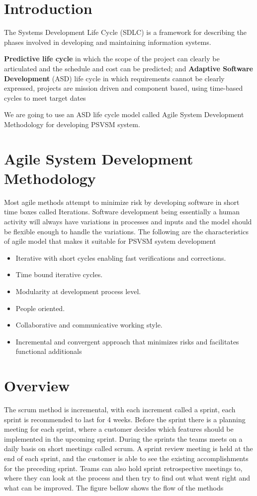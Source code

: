 \documentclass[a4paper, 12pt]{report}
\begin{document}
\section{Introduction}
\noindent The Systems Development Life Cycle (SDLC) is a framework for describing the phases involved
in developing and maintaining information systems.\par 
\noindent \textbf{Predictive life cycle} in which the scope of the project can clearly be articulated and the schedule
and cost can be predicted; and \textbf{ Adaptive Software Development} (ASD) life cycle in which
requirements cannot be clearly expressed, projects are mission driven and component based,
using time-based cycles to meet target dates \par 
\noindent We are going to use an ASD life cycle model called Agile System Development Methodology
for developing PSVSM system.

\section{Agile System Development Methodology}
\noindent Most agile methods attempt to minimize risk by developing software in short time boxes called
Iterations. Software development being essentially a human activity will always have variations
in processes and inputs and the model should be flexible enough to handle the variations. The
following are the characteristics of agile model that makes it suitable for PSVSM system development
\begin{itemize}
\item Iterative with short cycles enabling fast verifications and corrections.
\item Time bound iterative cycles.
\item Modularity at development process level.
\item People oriented.
\item Collaborative and communicative working style.
\item Incremental and convergent approach that minimizes risks and facilitates functional additionals
\end{itemize}
\section{Overview}
\noindent The scrum method is incremental, with each increment called a sprint, each sprint is
recommended to last for 4 weeks. Before the sprint there is a planning meeting for each sprint,
where a customer decides which features should be implemented in the upcoming sprint. During
the sprints the teams meets on a daily basis on short meetings called scrum. A sprint review
meeting is held at the end of each sprint, and the customer is able to see the existing
accomplishments for the preceding sprint. Teams can also hold sprint retrospective meetings to,
where they can look at the process and then try to find out what went right and what can be
improved. The figure bellow shows the flow of the methods
\end{document}
